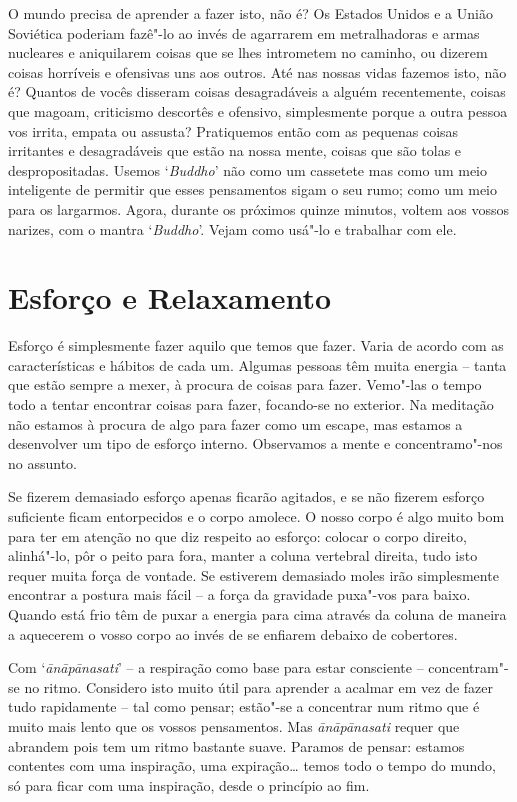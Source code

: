 O mundo precisa de aprender a fazer isto, não é? Os Estados Unidos e a
União Soviética poderiam fazê"-lo ao invés de agarrarem em metralhadoras
e armas nucleares e \mbox{aniquilarem} coisas que se lhes intrometem no
caminho, ou dizerem coisas horríveis e ofensivas uns aos outros. Até nas
nossas vidas fazemos isto, não é? Quantos de vocês disseram
coisas desagradáveis a alguém recentemente, coisas que magoam,
criticismo descortês e ofensivo, simplesmente porque a outra pessoa vos
irrita, empata ou assusta? Pratiquemos então com as pequenas coisas
irritantes e desagradáveis que estão na nossa mente, coisas que são
tolas e despropositadas. Usemos `\emph{Buddho}' não como um cassetete mas 
como um meio inteligente de permitir que esses pensamentos sigam o seu 
rumo; como um meio para os largarmos. Agora, durante os próximos quinze
minutos, voltem aos vossos narizes, com o mantra `\emph{Buddho}'. Vejam
como usá"-lo e trabalhar com ele.

\chapter{Esforço e Relaxamento}

Esforço é simplesmente fazer aquilo que temos que fazer. Varia de acordo
com as características e hábitos de cada um. Algumas pessoas têm muita
energia -- tanta que estão sempre a mexer, à procura de coisas para
fazer. Vemo"-las o tempo todo a tentar encontrar coisas para fazer,
focando-se no exterior. Na meditação não estamos à procura de algo
para fazer como um escape, mas estamos a desenvolver um tipo de esforço
interno. Observamos a mente e concentramo"-nos no assunto.

Se fizerem demasiado esforço apenas ficarão agitados, e se não fizerem
esforço suficiente ficam entorpecidos e o corpo amolece. O nosso corpo é
algo muito bom para ter em atenção no que diz respeito ao esforço:
colocar o corpo direito, alinhá"-lo, pôr o peito para fora, manter a
coluna vertebral direita, tudo isto requer muita força de vontade. Se
estiverem demasiado moles irão simplesmente encontrar a postura mais
fácil -- a força da gravidade puxa"-vos para baixo. Quando está frio têm
de puxar a energia para cima através da coluna de maneira a aquecerem o
vosso corpo ao invés de se enfiarem debaixo de cobertores.

Com `\emph{ānāpānasati}' --  a respiração como base para estar
consciente -- concentram"-se no ritmo. Considero isto muito útil para
aprender a acalmar em vez de fazer tudo rapidamente -- tal como pensar;
estão"-se a concentrar num ritmo que é muito mais lento que os vossos
pensamentos. Mas \emph{ānāpānasati} requer que abrandem pois tem um
ritmo bastante suave. Paramos de pensar: estamos contentes com uma
inspiração, uma expiração\ldots{} temos todo o tempo do mundo, só para 
ficar com uma inspiração, desde o princípio ao fim.

